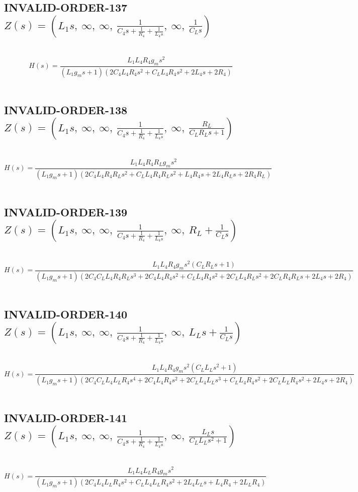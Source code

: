\documentclass{article}
\begin{document}
\subsection{INVALID-ORDER-137 $Z(s) = \left( L_{1} s, \  \infty, \  \infty, \  \frac{1}{C_{4} s + \frac{1}{R_{4}} + \frac{1}{L_{4} s}}, \  \infty, \  \frac{1}{C_{L} s}\right)$ } \ 
\textbf{\[H(s) = \frac{L_{1} L_{4} R_{4} g_{m} s^{2}}{\left(L_{1} g_{m} s + 1\right) \left(2 C_{4} L_{4} R_{4} s^{2} + C_{L} L_{4} R_{4} s^{2} + 2 L_{4} s + 2 R_{4}\right)}\] } \ 
\subsection{INVALID-ORDER-138 $Z(s) = \left( L_{1} s, \  \infty, \  \infty, \  \frac{1}{C_{4} s + \frac{1}{R_{4}} + \frac{1}{L_{4} s}}, \  \infty, \  \frac{R_{L}}{C_{L} R_{L} s + 1}\right)$ } \ 
\textbf{\[H(s) = \frac{L_{1} L_{4} R_{4} R_{L} g_{m} s^{2}}{\left(L_{1} g_{m} s + 1\right) \left(2 C_{4} L_{4} R_{4} R_{L} s^{2} + C_{L} L_{4} R_{4} R_{L} s^{2} + L_{4} R_{4} s + 2 L_{4} R_{L} s + 2 R_{4} R_{L}\right)}\] } \ 
\subsection{INVALID-ORDER-139 $Z(s) = \left( L_{1} s, \  \infty, \  \infty, \  \frac{1}{C_{4} s + \frac{1}{R_{4}} + \frac{1}{L_{4} s}}, \  \infty, \  R_{L} + \frac{1}{C_{L} s}\right)$ } \ 
\textbf{\[H(s) = \frac{L_{1} L_{4} R_{4} g_{m} s^{2} \left(C_{L} R_{L} s + 1\right)}{\left(L_{1} g_{m} s + 1\right) \left(2 C_{4} C_{L} L_{4} R_{4} R_{L} s^{3} + 2 C_{4} L_{4} R_{4} s^{2} + C_{L} L_{4} R_{4} s^{2} + 2 C_{L} L_{4} R_{L} s^{2} + 2 C_{L} R_{4} R_{L} s + 2 L_{4} s + 2 R_{4}\right)}\] } \ 
\subsection{INVALID-ORDER-140 $Z(s) = \left( L_{1} s, \  \infty, \  \infty, \  \frac{1}{C_{4} s + \frac{1}{R_{4}} + \frac{1}{L_{4} s}}, \  \infty, \  L_{L} s + \frac{1}{C_{L} s}\right)$ } \ 
\textbf{\[H(s) = \frac{L_{1} L_{4} R_{4} g_{m} s^{2} \left(C_{L} L_{L} s^{2} + 1\right)}{\left(L_{1} g_{m} s + 1\right) \left(2 C_{4} C_{L} L_{4} L_{L} R_{4} s^{4} + 2 C_{4} L_{4} R_{4} s^{2} + 2 C_{L} L_{4} L_{L} s^{3} + C_{L} L_{4} R_{4} s^{2} + 2 C_{L} L_{L} R_{4} s^{2} + 2 L_{4} s + 2 R_{4}\right)}\] } \ 
\subsection{INVALID-ORDER-141 $Z(s) = \left( L_{1} s, \  \infty, \  \infty, \  \frac{1}{C_{4} s + \frac{1}{R_{4}} + \frac{1}{L_{4} s}}, \  \infty, \  \frac{L_{L} s}{C_{L} L_{L} s^{2} + 1}\right)$ } \ 
\textbf{\[H(s) = \frac{L_{1} L_{4} L_{L} R_{4} g_{m} s^{2}}{\left(L_{1} g_{m} s + 1\right) \left(2 C_{4} L_{4} L_{L} R_{4} s^{2} + C_{L} L_{4} L_{L} R_{4} s^{2} + 2 L_{4} L_{L} s + L_{4} R_{4} + 2 L_{L} R_{4}\right)}\] } \ 
\end{document}
